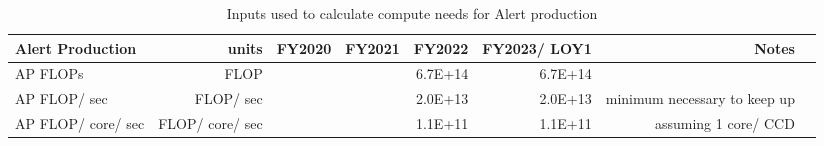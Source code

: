 \tiny \begin{longtable} { |p{}  |r  |r  |r  |r  |r  |r  |r |} 
\caption{Inputs used to calculate compute needs for Alert production \label{tab:alertSizing}}\\ 
\hline 
{Alert Production}&{units}&{FY2020}&{FY2021}&{FY2022}&{FY2023/ LOY1}&{Notes} \\ \hline
{AP FLOPs}&{FLOP}&{}&{}&{6.7E+14}&{6.7E+14}& \\ \hline
{AP FLOP/ sec}&{FLOP/ sec}&{}&{}&{2.0E+13}&{2.0E+13}&{minimum necessary to keep up} \\ \hline
{AP FLOP/ core/ sec}&{FLOP/ core/ sec}&{}&{}&{1.1E+11}&{1.1E+11}&{assuming 1 core/ CCD} \\ \hline
\end{longtable} \normalsize
